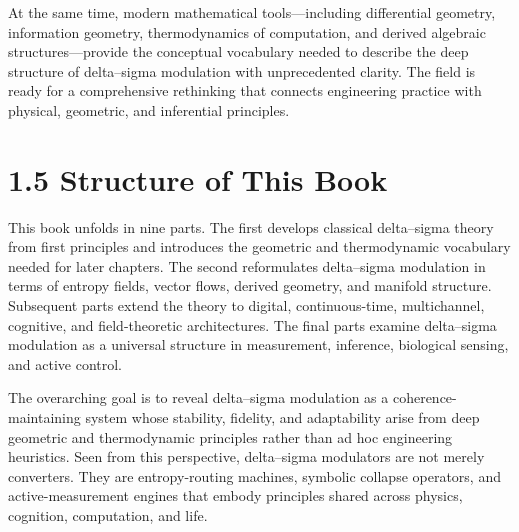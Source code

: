 At the same time, modern mathematical tools---including differential geometry, information geometry, thermodynamics of computation, and derived algebraic structures---provide the conceptual vocabulary needed to describe the deep structure of delta--sigma modulation with unprecedented clarity. The field is ready for a comprehensive rethinking that connects engineering practice with physical, geometric, and inferential principles.

\section*{1.5 Structure of This Book}

This book unfolds in nine parts. The first develops classical delta--sigma theory from first principles and introduces the geometric and thermodynamic vocabulary needed for later chapters. The second reformulates delta--sigma modulation in terms of entropy fields, vector flows, derived geometry, and manifold structure. Subsequent parts extend the theory to digital, continuous-time, multichannel, cognitive, and field-theoretic architectures. The final parts examine delta--sigma modulation as a universal structure in measurement, inference, biological sensing, and active control.

The overarching goal is to reveal delta--sigma modulation as a coherence-maintaining system whose stability, fidelity, and adaptability arise from deep geometric and thermodynamic principles rather than ad hoc engineering heuristics. Seen from this perspective, delta--sigma modulators are not merely converters. They are entropy-routing machines, symbolic collapse operators, and active-measurement engines that embody principles shared across physics, cognition, computation, and life.
